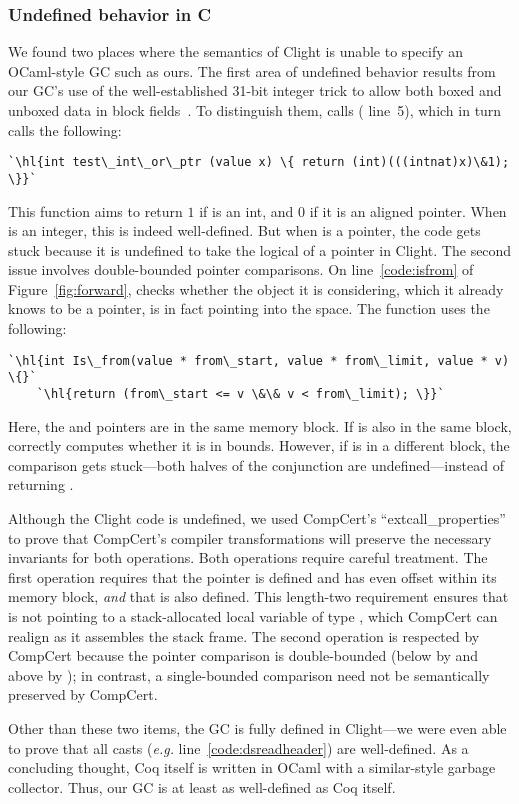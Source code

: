 \subsubsection*{Undefined behavior in C} %
We found two places where the semantics of Clight is unable to specify an OCaml-style GC such as ours.
The first area of undefined behavior results from our GC's use of the well-established
31-bit integer trick to allow both boxed and unboxed data in block fields~\cite{realworldocaml}.
To distinguish them,  calls  ({\color{black} line~5}), which
in turn calls the following:
\begin{lstlisting}[numbers=none]
  `\hl{int test\_int\_or\_ptr (value x) \{ return (int)(((intnat)x)\&1); \}}`
\end{lstlisting}
This function aims to return $1$ if  is an int, and $0$ if it is an aligned pointer.
When  is an integer, this is indeed well-defined. 
But when  is a pointer, the code gets stuck because
it is undefined to take the logical  of a pointer in Clight.
The second issue involves double-bounded pointer comparisons.
On line~\ref{code:isfrom} of Figure~\ref{fig:forward},  checks 
whether the object it is considering, which it already knows to be a pointer,
is in fact pointing into the  space.  The  function uses the following:
\begin{lstlisting}[numbers=none]
  `\hl{int Is\_from(value * from\_start, value * from\_limit, value * v) \{}`
    `\hl{return (from\_start <= v \&\& v < from\_limit); \}}`
\end{lstlisting}
Here, the  and  pointers are in the same
memory block. If  is also in the same block, 
correctly computes whether it is in bounds.
However, if  is in a different block, the comparison gets stuck---both halves 
of the conjunction are undefined---instead of
returning .

Although the Clight code is undefined, we used CompCert's ``extcall{\_}properties''
to prove that CompCert's compiler transformations will preserve the necessary invariants
for both operations. Both operations require careful treatment.  The first operation 
requires that the  pointer is defined and has even offset within its memory block, 
\emph{and} that  is also defined.  This length-two requirement ensures that
 is not pointing to a stack-allocated local variable of type ,
which CompCert can realign as it assembles the stack frame.  The second operation
is respected by CompCert because the pointer comparison is double-bounded (below by 
 and above by ); in contrast, a single-bounded 
comparison need not be semantically preserved by CompCert.

Other than these two items, the GC is fully defined in Clight---we were even able to
prove that all casts (\emph{e.g.} line~\ref{code:dsreadheader}) are well-defined.
As a concluding thought, Coq itself is written in OCaml with a similar-style garbage 
collector. Thus, our GC is at least as well-defined as Coq itself.
